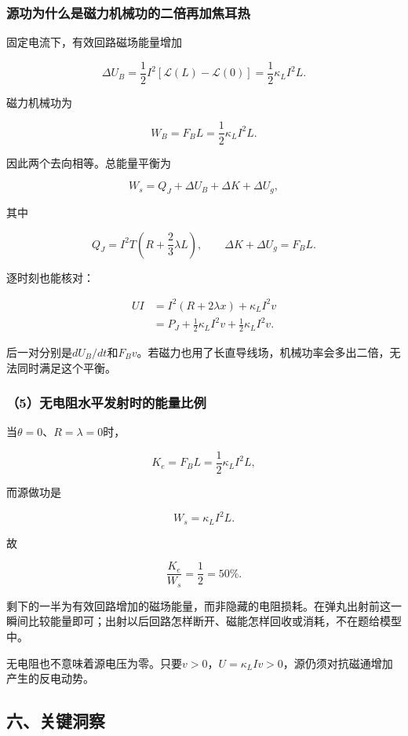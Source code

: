 \documentclass[12pt,a4paper,fontset=fandol]{ctexart}
\begin{document}
\subsubsection{源功为什么是磁力机械功的二倍再加焦耳热}\label{ux6e90ux529fux4e3aux4ec0ux4e48ux662fux78c1ux529bux673aux68b0ux529fux7684ux4e8cux500dux518dux52a0ux7126ux8033ux70ed}

固定电流下，有效回路磁场能量增加

\[
\Delta U_B=\frac12I^2[\mathcal L(L)-\mathcal L(0)]
=\frac12\kappa_LI^2L.
\]

磁力机械功为

\[
W_B=F_BL=\frac12\kappa_LI^2L.
\]

因此两个去向相等。总能量平衡为

\[
\boxed{
W_s=Q_J+\Delta U_B+\Delta K+\Delta U_g},
\]

其中

\[
Q_J=I^2T\left(R+\frac23\lambda L\right),
\qquad
\Delta K+\Delta U_g=F_BL.
\]

逐时刻也能核对：

\[
\begin{aligned}
UI
&=I^2(R+2\lambda x)+\kappa_LI^2v\\
&=P_J+\frac12\kappa_LI^2v+\frac12\kappa_LI^2v.
\end{aligned}
\]

后一对分别是\(dU_B/dt\)和\(F_Bv\)。若磁力也用了长直导线场，机械功率会多出二倍，无法同时满足这个平衡。

\subsubsection{（5）无电阻水平发射时的能量比例}\label{ux65e0ux7535ux963bux6c34ux5e73ux53d1ux5c04ux65f6ux7684ux80fdux91cfux6bd4ux4f8b}

当\(\theta=0\)、\(R=\lambda=0\)时，

\[
K_e=F_BL=\frac12\kappa_LI^2L,
\]

而源做功是

\[
W_s=\kappa_LI^2L.
\]

故

\[
\boxed{\frac{K_e}{W_s}=\frac12=50\%}.
\]

剩下的一半为有效回路增加的磁场能量，而非隐藏的电阻损耗。在弹丸出射前这一瞬间比较能量即可；出射以后回路怎样断开、磁能怎样回收或消耗，不在题给模型中。

无电阻也不意味着源电压为零。只要\(v>0\)，\(U=\kappa_LIv>0\)，源仍须对抗磁通增加产生的反电动势。

\subsection{六、关键洞察}\label{ux516dux5173ux952eux6d1eux5bdf-2}
\end{document}
